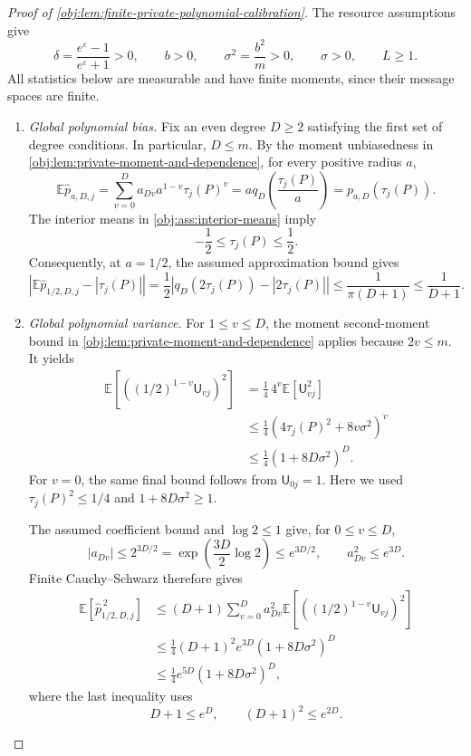 \documentclass[11pt]{article}
\begin{document}
\begin{proof}[Proof of \cref{obj:lem:finite-private-polynomial-calibration}]
The resource assumptions give
\[
\delta=\frac{e^\varepsilon-1}{e^\varepsilon+1}>0,
\qquad b>0,
\qquad \sigma^2=\frac{b^2}{m}>0,
\qquad \sigma>0,
\qquad L\ge1.
\]
All statistics below are measurable and have finite moments, since their message spaces are finite.

\begin{enumerate}
\item \textit{Global polynomial bias.}
Fix an even degree \(D\ge2\) satisfying the first set of degree conditions. In particular, \(D\le m\). By the moment unbiasedness in \cref{obj:lem:private-moment-and-dependence}, for every positive radius \(a\),
\[
\mathbb E\widehat p_{a,D,j}
=\sum_{v=0}^D a_{Dv}a^{1-v}\tau_j(P)^v
=a q_D\!\left(\frac{\tau_j(P)}a\right)
=p_{a,D}(\tau_j(P)).
\]
The interior means in \cref{obj:ass:interior-means} imply
\[
-\frac12\le\tau_j(P)\le\frac12.
\]
Consequently, at \(a=1/2\), the assumed approximation bound gives
\[
\left|\mathbb E\widehat p_{1/2,D,j}-|\tau_j(P)|\right|
=\frac12\left|q_D(2\tau_j(P))-|2\tau_j(P)|\right|
\le\frac1{\pi(D+1)}
\le\frac1{D+1}.
\]

\item \textit{Global polynomial variance.}
For \(1\le v\le D\), the moment second-moment bound in \cref{obj:lem:private-moment-and-dependence} applies because \(2v\le m\). It yields
\[
\begin{aligned}
\mathbb E\left[\left((1/2)^{1-v}\mathsf U_{vj}\right)^2\right]
&=\frac14\,4^v\mathbb E[\mathsf U_{vj}^2]\\
&\le\frac14\left(4\tau_j(P)^2+8v\sigma^2\right)^v\\
&\le\frac14(1+8D\sigma^2)^D.
\end{aligned}
\]
For \(v=0\), the same final bound follows from \(\mathsf U_{0j}=1\). Here we used \(\tau_j(P)^2\le1/4\) and \(1+8D\sigma^2\ge1\).

The assumed coefficient bound and \(\log2\le1\) give, for \(0\le v\le D\),
\[
|a_{Dv}|
\le 2^{3D/2}
=\exp\!\left(\frac{3D}{2}\log2\right)
\le e^{3D/2},
\qquad
a_{Dv}^2\le e^{3D}.
\]
Finite Cauchy--Schwarz therefore gives
\[
\begin{aligned}
\mathbb E[\widehat p_{1/2,D,j}^{\,2}]
&\le(D+1)\sum_{v=0}^D
 a_{Dv}^2
 \mathbb E\left[\left((1/2)^{1-v}\mathsf U_{vj}\right)^2\right]\\
&\le\frac14(D+1)^2e^{3D}(1+8D\sigma^2)^D\\
&\le\frac14e^{5D}(1+8D\sigma^2)^D,
\end{aligned}
\]
where the last inequality uses
\[
D+1\le e^D,
\qquad (D+1)^2\le e^{2D}.
\]


\end{enumerate}
\end{proof}
\end{document}
